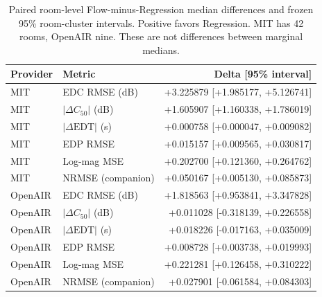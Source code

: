 \begin{table}[t]
\centering\scriptsize
\caption{Paired room-level Flow-minus-Regression median differences and frozen 95\% room-cluster intervals. Positive favors Regression. MIT has 42 rooms, OpenAIR nine. These are not differences between marginal medians.}
\label{tab:e3paired}
\begin{tabular}{llr}
\toprule
Provider & Metric & Delta [95\% interval] \\
\midrule
MIT & EDC RMSE (dB) & +3.225879 [+1.985177, +5.126741] \\
MIT & $|\Delta C_{50}|$ (dB) & +1.605907 [+1.160338, +1.786019] \\
MIT & $|\Delta\mathrm{EDT}|$ (s) & +0.000758 [+0.000047, +0.009082] \\
MIT & EDP RMSE & +0.015157 [+0.009565, +0.030817] \\
MIT & Log-mag MSE & +0.202700 [+0.121360, +0.264762] \\
MIT & NRMSE (companion) & +0.050167 [+0.005130, +0.085873] \\
OpenAIR & EDC RMSE (dB) & +1.818563 [+0.953841, +3.347828] \\
OpenAIR & $|\Delta C_{50}|$ (dB) & +0.011028 [-0.318139, +0.226558] \\
OpenAIR & $|\Delta\mathrm{EDT}|$ (s) & +0.018226 [-0.017163, +0.035009] \\
OpenAIR & EDP RMSE & +0.008728 [+0.003738, +0.019993] \\
OpenAIR & Log-mag MSE & +0.221281 [+0.126458, +0.310222] \\
OpenAIR & NRMSE (companion) & +0.027901 [-0.061584, +0.084303] \\
\bottomrule
\end{tabular}
\end{table}
